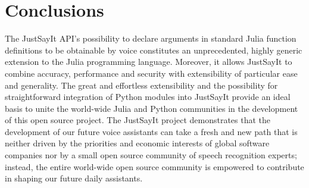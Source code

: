 \documentclass{juliacon}
\begin{document}
\section{Conclusions}
The JustSayIt API's possibility to declare arguments in standard Julia function definitions to be obtainable by voice constitutes an unprecedented, highly generic extension to the Julia programming language. Moreover, it allows JustSayIt to combine accuracy, performance and security with extensibility of particular ease and generality.
The great and effortless extensibility and the possibility for straightforward integration of Python modules into JustSayIt provide an ideal basis to unite the world-wide Julia and Python communities in the development of this open source project.
The JustSayIt project demonstrates that the development of our future voice assistants can take a fresh and new path that is neither driven by the priorities and economic interests of global software companies nor by a small open source community of speech recognition experts; instead, the entire world-wide open source community is empowered to contribute in shaping our future daily assistants.


\end{document}
